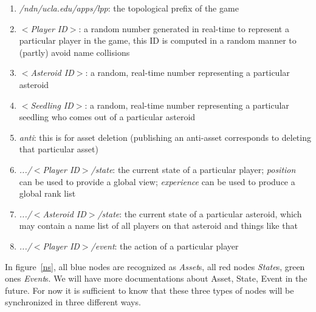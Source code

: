 \documentclass{article}
\begin{document}
\begin{enumerate}
\item \emph{/ndn/ucla.edu/apps/lpp}: the topological prefix of the game
\item \emph{$<$Player ID$>$}: a random number generated in real-time to represent a particular player in the game, this ID is computed in a random manner to (partly) avoid name collisions
\item \emph{$<$Asteroid ID$>$}: a random, real-time number representing a particular asteroid
\item \emph{$<$Seedling ID$>$}: a random, real-time number representing a particular seedling who comes out of a particular asteroid
\item \emph{anti}: this is for asset deletion (publishing an anti-asset corresponds to deleting that particular asset)
\item \emph{.../$<$Player ID$>$/state}: the current state of a particular player; \emph{position} can be used to provide a global view; \emph{experience} can be used to produce a global rank list
\item \emph{.../$<$Asteroid ID$>$/state}: the current state of a particular asteroid, which may contain a name list of all players on that asteroid and things like that
\item \emph{.../$<$Player ID$>$/event}: the action of a particular player
\end{enumerate}

In figure~\ref{ns}, all blue nodes are recognized as \emph{Asset}s, all red nodes \emph{State}s, green ones \emph{Event}s. We will have more documentations about Asset, State, Event in the future. For now it is sufficient to know that these three types of nodes will be synchronized in three different ways.
\end{document}
